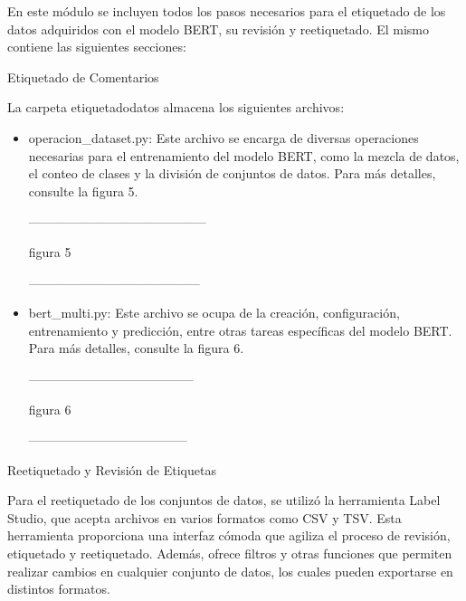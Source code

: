 En este módulo se incluyen todos los pasos necesarios para el etiquetado de los datos adquiridos con el modelo BERT, su revisión y reetiquetado. El mismo contiene las siguientes secciones:

Etiquetado de Comentarios

La carpeta etiquetadodatos almacena los siguientes archivos:

\begin{itemize}

\item operacion\_dataset.py: Este archivo se encarga de diversas operaciones necesarias para el entrenamiento del modelo BERT, como la mezcla de datos, el conteo de clases y la división de conjuntos de datos. Para más detalles, consulte la figura 5.

------------------------------------------

figura 5

-----------------------------------------

\item bert\_multi.py: Este archivo se ocupa de la creación, configuración, entrenamiento y predicción, entre otras tareas específicas del modelo BERT. Para más detalles, consulte la figura 6.

---------------------------------------

figura 6

--------------------------------------

\end{itemize}

Reetiquetado y Revisión de Etiquetas

Para el reetiquetado de los conjuntos de datos, se utilizó la herramienta Label Studio, que acepta archivos en varios formatos como CSV y TSV. Esta herramienta proporciona una interfaz cómoda que agiliza el proceso de revisión, etiquetado y reetiquetado. Además, ofrece filtros y otras funciones que permiten realizar cambios en cualquier conjunto de datos, los cuales pueden exportarse en distintos formatos.


